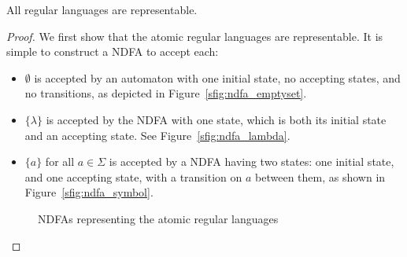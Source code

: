 \documentclass{bcthesis}
\begin{document}
	\begin{claim}
	\label{prop:regular_languages_representable}
		All regular languages are representable.
	\end{claim}
	\begin{proof}
		We first show that the atomic regular languages are representable.
		It is simple to construct a NDFA to accept each:
		\begin{itemize}
			\item [] $\emptyset$ is accepted by an automaton with one initial state, no accepting states, and no transitions, as depicted in Figure~\ref{sfig:ndfa_emptyset}.
			\item [] $\{ \lambda \}$ is accepted by the NDFA with one state, which is both its initial state and an accepting state. See Figure~\ref{sfig:ndfa_lambda}.
			\item [] $\{ a \}$ for all $a \in \Sigma$ is accepted by a NDFA having two states: one initial state, and one accepting state, with a transition on $a$ between them, as shown in Figure~\ref{sfig:ndfa_symbol}.
		\end{itemize}


		\begin{figure}[H]
			\centering
			\setlength{\fboxrule}{0 pt}
			\caption{NDFAs representing the atomic regular languages}
			\label{fig:ndfa_atomic_regular_languages}
		\end{figure}


\end{proof}
\end{document}

